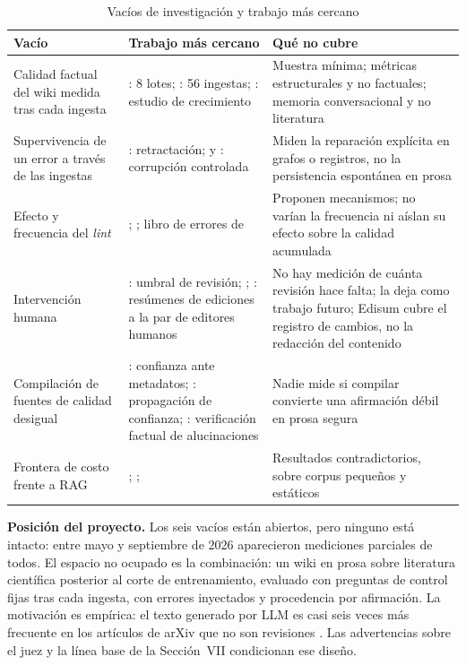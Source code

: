 \documentclass[11pt,letterpaper]{article}
\begin{document}
\begin{table}[!ht]
\caption{Vacíos de investigación y trabajo más cercano}\label{tab:vacios}
\small
\begin{tabular}{L{4.2cm}L{5.3cm}L{5.3cm}}
\toprule
Vacío & Trabajo más cercano & Qué no cubre \\
\midrule
Calidad factual del wiki medida tras cada ingesta & \citet{zhang2026pilot}: 8 lotes; \citet{ran2026}: 56 ingestas; \citet{zhou2026}: estudio de crecimiento & Muestra mínima; métricas estructurales y no factuales; memoria conversacional y no literatura \\
Supervivencia de un error a través de las ingestas & \citet{zhang2026prov}: retractación; \citet{yu2026} y \citet{mishra2026}: corrupción controlada & Miden la reparación explícita en grafos o registros, no la persistencia espontánea en prosa \\
Efecto y frecuencia del \emph{lint} & \citet{huang2026deeprefine}; \citet{huerta2026wicer}; libro de errores de \citet{ming2026llmwiki} & Proponen mecanismos; no varían la frecuencia ni aíslan su efecto sobre la calidad acumulada \\
Intervención humana & \citet{zhang2026prov}: umbral de revisión; \citet{jiang2024}; \citet{sakota2024}: resúmenes de ediciones a la par de editores humanos & No hay medición de cuánta revisión hace falta; \citet{zhang2026pilot} la deja como trabajo futuro; Edisum cubre el registro de cambios, no la redacción del contenido \\
Compilación de fuentes de calidad desigual & \citet{hu2026trust}: confianza ante metadatos; \citet{zhang2026prov}: propagación de confianza; \citet{zhang2024knowhalu}: verificación factual de alucinaciones & Nadie mide si compilar convierte una afirmación débil en prosa segura \\
Frontera de costo frente a RAG & \citet{wen2026}; \citet{cochran2026rag}; \citet{cochran2026progressive} & Resultados contradictorios, sobre corpus pequeños y estáticos \\
\bottomrule
\end{tabular}
\end{table}

\textbf{Posición del proyecto.} Los seis vacíos están abiertos, pero ninguno está intacto: entre mayo y septiembre de 2026 aparecieron mediciones parciales de todos. El espacio no ocupado es la combinación: un wiki en prosa sobre literatura científica posterior al corte de entrenamiento, evaluado con preguntas de control fijas tras cada ingesta, con errores inyectados y procedencia por afirmación. La motivación es empírica: el texto generado por LLM es casi seis veces más frecuente en los artículos de arXiv que no son revisiones \citep{elazar2026}. Las advertencias sobre el juez y la línea base de la Sección~VII condicionan ese diseño.
\end{document}
